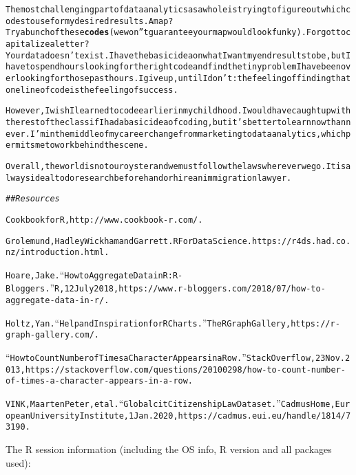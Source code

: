 \documentclass{article}\usepackage[]{graphicx}\usepackage[]{xcolor}
\makeatletter
\newcommand{\hlstr}[1]{\textcolor[rgb]{0.192,0.494,0.8}{#1}}%
\newcommand{\hlcom}[1]{\textcolor[rgb]{0.678,0.584,0.686}{\textit{#1}}}%
\newcommand{\hlkwd}[1]{\textcolor[rgb]{0.737,0.353,0.396}{\textbf{#1}}}%
\newenvironment{kframe}{%
 \def\at@end@of@kframe{}%
 \ifinner\ifhmode%
  \def\at@end@of@kframe{\end{minipage}}%
  \begin{minipage}{\columnwidth}%
 \fi\fi%
 \def\FrameCommand##1{\hskip\@totalleftmargin \hskip-\fboxsep
 \colorbox{shadecolor}{##1}\hskip-\fboxsep
     \hskip-\linewidth \hskip-\@totalleftmargin \hskip\columnwidth}%
 \MakeFramed {\advance\hsize-\width
   \@totalleftmargin\z@ \linewidth\hsize
   \@setminipage}}%
 {\par\unskip\endMakeFramed%
 \at@end@of@kframe}
\newenvironment{knitrout}{}{} %
\makeatother
\begin{document}
\begin{knitrout}
\begin{kframe}
\begin{alltt}
The most challenging part of data analytics as a whole is trying to figure out which codes to use for my desired results. A map? Try a bunch of these \hlkwd{codes} (we won\hlstr{''}t guarantee your map would look funky). Forgot to capitalize a letter? Your data doesn\hlstr{'t exist. I have the basic idea on what I want my end results to be, but I have to spend hours looking for the right code and find the tiny problem I have been overlooking for those past hours. I give up, until I don'}t: the feeling of finding that one line of code is the feeling of success. 

However, I wish I learned to code earlier in my childhood. I would have caught up with the rest of the class if I had a basic idea of coding, but it\hlstr{'s better to learn now than never. I'}m in the middle of my career change from marketing to data analytics, which permits me to work behind the scene. 

Overall, the world is not our oyster and we must follow the laws wherever we go. It is always ideal to do research beforehand or hire an immigration lawyer. 

\hlcom{## Resources}

Cookbook for R, http://www.cookbook-r.com/. 

Grolemund, Hadley Wickham and Garrett. R For Data Science. https://r4ds.had.co.nz/introduction.html. 

Hoare, Jake. “How to Aggregate Data in R: R-Bloggers.” R, 12 July 2018, https://www.r-bloggers.com/2018/07/how-to-aggregate-data-in-r/. 

Holtz, Yan. “Help and Inspiration for R Charts.” The R Graph Gallery, https://r-graph-gallery.com/. 

“How to Count Number of Times a Character Appears in a Row.” Stack Overflow, 23 Nov. 2013, https://stackoverflow.com/questions/20100298/how-to-count-number-of-times-a-character-appears-in-a-row. 

VINK, Maarten Peter, et al. “Globalcit Citizenship Law Dataset.” Cadmus Home, European University Institute, 1 Jan. 2020, https://cadmus.eui.eu/handle/1814/73190. 
\end{alltt}


{\ttfamily\noindent\bfseries\color{errorcolor}{\#\# Error: attempt to use zero-length variable name}}\end{kframe}
\end{knitrout}

The R session information (including the OS info, R version and all
packages used):
\end{document}
